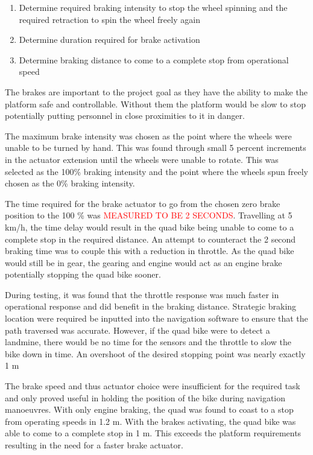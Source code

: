 \documentclass[main.tex]{subfiles}
\begin{document}
\begin{enumerate}
\item Determine required braking intensity to stop the wheel spinning and the required retraction to spin the wheel freely again
\item Determine duration required for brake activation
\item Determine braking distance to come to a complete stop from operational speed  
\end{enumerate}

The brakes are important to the project goal as they have the ability to make the platform safe and controllable. Without them the platform would be slow to stop potentially putting personnel in close proximities to it in danger. 


The maximum brake intensity was chosen as the point where the wheels were unable to be turned by hand. This was found through small 5 percent increments in the actuator extension until the wheels were unable to rotate. This was selected as the 100\% braking intensity and the point where the wheels spun freely chosen as the 0\% braking intensity.

The time required for the brake actuator to go from the chosen zero brake position to the 100 \% was \textcolor{red}{MEASURED TO BE 2 SECONDS}. Travelling at 5 km/h, the time delay would result in the quad bike being unable to come to a complete stop in the required distance. An attempt to counteract the 2 second braking time was to couple this with a reduction in throttle. As the quad bike would still be in gear, the gearing and engine would act as an engine brake potentially stopping the quad bike sooner. 

During testing, it was found that the throttle response was much faster in operational response and did benefit in the braking distance. Strategic braking location were required be inputted into the navigation software to ensure that the path traversed was accurate. However, if the quad bike were to detect a landmine, there would be no time for the sensors and the throttle to slow the bike down in time. An overshoot of the desired stopping point was nearly exactly 1 m

The brake speed and thus actuator choice were insufficient for the required task and only proved useful in holding the position of the bike during navigation manoeuvres. With only engine braking, the quad was found to coast to a stop from operating speeds in 1.2 m. With the brakes activating, the quad bike was able to come to a complete stop in 1 m. This exceeds the platform requirements resulting in the need for  a faster brake actuator.     
\end{document}
